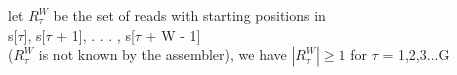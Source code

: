 \documentclass[preview]{standalone}
\begin{document}
\begin{center}
let $R^W_{\tau}$  be the set of reads with starting positions in\\ s[$\tau$], s[$\tau$ + 1], . . . , s[$\tau$ + W - 1] \\($R^W_{\tau}$ is not known by the assembler), we have $|R^W_{\tau}| \ge 1$ for $\tau$ = 1,2,3...G
\end{center}
\end{document}
